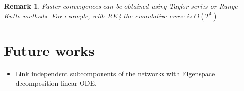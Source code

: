 \documentclass{article}
\newtheorem{remark}[theorem]{Remark}
\begin{document}
\begin{remark}
  Faster convergences can be obtained using Taylor series or Runge-Kutta
  methods. For example, with RK4 the cumulative error is $O(T^4)$.
\end{remark}

\section{Future works}
\begin{itemize}
\item Link independent subcomponents of the networks with Eigenspace
  decomposition linear ODE.
\end{itemize}



\end{document}
